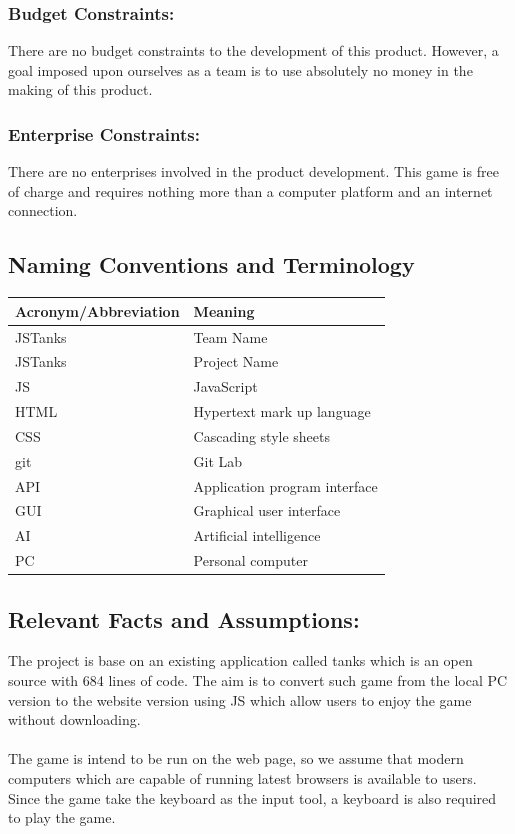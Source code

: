 \documentclass{article}
\begin{document}
\subsubsection{Budget Constraints:} 
There are no budget constraints to the
development of this product. However, a goal imposed upon ourselves as a team is
to use absolutely no money in the making of this product.

\subsubsection{Enterprise Constraints:} 
There are no enterprises involved in the
product development. This game is free of charge and requires nothing more than
a computer platform and an internet connection.


\subsection{Naming Conventions and Terminology}
\begin{tabular}{ | l | l |}
\hline
Acronym/Abbreviation  & Meaning\\\hline
JSTanks & Team Name\\\hline
JSTanks & Project Name\\\hline
JS & JavaScript\\\hline
HTML & Hypertext mark up language\\\hline
CSS & Cascading style sheets\\\hline
git & Git Lab\\\hline
API & Application program interface\\\hline
GUI & Graphical user interface\\\hline
AI & Artificial intelligence\\\hline
PC & Personal computer\\\hline
\end{tabular}

\subsection{Relevant Facts and Assumptions:} 
The project is base on an existing
application called tanks which is an open source with 684 lines of code. The aim
is to convert such game from the local PC version to the website version using
JS which allow users to enjoy the game without downloading.\\\\ The game is
intend to be run on the web page, so we assume that modern computers which are
capable of running latest browsers is available to users. Since the game take
the keyboard as the input tool, a keyboard is also required to play the game.
\end{document}

